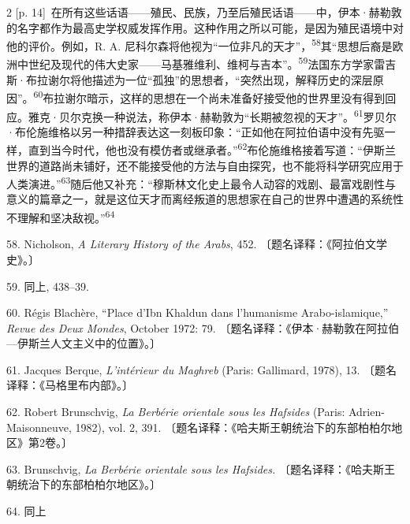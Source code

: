 \documentclass[10pt,a4paper]{article}
\begin{document}
\begin{paracol}{2}
{\scriptsize\color{gray} [p. 14]}\ 在所有这些话语——殖民、民族，乃至后殖民话语——中，伊本·赫勒敦的名字都作为最高史学权威发挥作用。这种作用之所以可能，是因为殖民语境中对他的评价。例如，R. A. 尼科尔森将他视为“一位非凡的天才”，\nobreak\textsuperscript{58}其“思想后裔是欧洲中世纪及现代的伟大史家——马基雅维利、维柯与吉本”。\nobreak\textsuperscript{59}法国东方学家雷吉斯·布拉谢尔将他描述为一位“孤独”的思想者，“突然出现，解释历史的深层原因”。\nobreak\textsuperscript{60}布拉谢尔暗示，这样的思想在一个尚未准备好接受他的世界里没有得到回应。雅克·贝尔克换一种说法，称伊本·赫勒敦为“长期被忽视的天才”。\nobreak\textsuperscript{61}罗贝尔·布伦施维格以另一种措辞表达这一刻板印象：“正如他在阿拉伯语中没有先驱一样，直到当今时代，他也没有模仿者或继承者。”\nobreak\textsuperscript{62}布伦施维格接着写道：“伊斯兰世界的道路尚未铺好，还不能接受他的方法与自由探究，也不能将科学研究应用于人类演进。”\nobreak\textsuperscript{63}随后他又补充：“穆斯林文化史上最令人动容的戏剧、最富戏剧性与意义的篇章之一，就是这位天才而离经叛道的思想家在自己的世界中遭遇的系统性不理解和坚决敌视。”\nobreak\textsuperscript{64}\par{\small 58. Nicholson, \textit{A Literary History of the Arabs}, 452. 〔题名译释：《阿拉伯文学史》。〕\par}{\small 59. 同上, 438–39.\par}{\small 60. Régis Blachère, “Place d’Ibn Khaldun dans l’humanisme Arabo-islamique,” \textit{Revue des Deux Mondes}, October 1972: 79. 〔题名译释：《伊本·赫勒敦在阿拉伯—伊斯兰人文主义中的位置》。〕\par}{\small 61. Jacques Berque, \textit{L’intérieur du Maghreb} (Paris: Gallimard, 1978), 13. 〔题名译释：《马格里布内部》。〕\par}{\small 62. Robert Brunschvig, \textit{La Berbérie orientale sous les Hafsides} (Paris: Adrien-Maisonneuve, 1982), vol. 2, 391. 〔题名译释：《哈夫斯王朝统治下的东部柏柏尔地区》第2卷。〕\par}{\small 63. Brunschvig, \textit{La Berbérie orientale sous les Hafsides.} 〔题名译释：《哈夫斯王朝统治下的东部柏柏尔地区》。〕\par}{\small 64. 同上\par}
\switchcolumn

\end{paracol}
\end{document}
